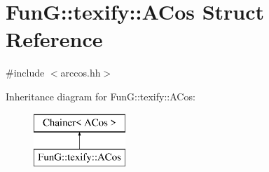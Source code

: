 \hypertarget{structFunG_1_1texify_1_1ACos}{\section{Fun\-G\-:\-:texify\-:\-:A\-Cos Struct Reference}
\label{structFunG_1_1texify_1_1ACos}
}


{\ttfamily \#include $<$arccos.\-hh$>$}

Inheritance diagram for Fun\-G\-:\-:texify\-:\-:A\-Cos\-:\begin{figure}[H]
\begin{center}
\leavevmode
\includegraphics[height=2.000000cm]{structFunG_1_1texify_1_1ACos}
\end{center}
\end{figure}
